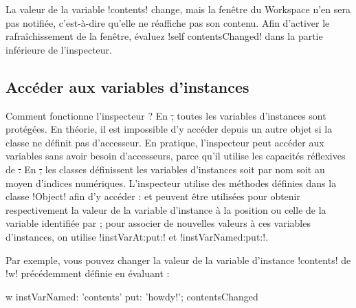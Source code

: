 \documentclass[a4paper,10pt,twoside]{book}
\begin{document}
La valeur de la variable \ct!contents! change, mais la fenêtre du Workspace n'en sera pas notifiée, c'est-à-dire qu'elle ne réaffiche pas son contenu.
Afin d'activer le rafraîchissement de la fenêtre, évaluez \ct!self contentsChanged! dans la partie inférieure de l'inspecteur.

\subsection{Accéder aux variables d'instances}

Comment fonctionne l'inspecteur ?
En \st, toutes les variables d'instances sont protégées.
En théorie, il est impossible d'y accéder depuis un autre objet si la classe ne définit pas d'accesseur.
En pratique, l'inspecteur peut accéder aux variables sans avoir besoin d'accesseurs, parce qu'il utilise les capacités réflexives de \st.
En \st, les classes définissent les variables d'instances soit par nom soit au moyen d'indices numériques.
L'inspecteur utilise des méthodes définies dans la classe \ct!Object! afin d'y accéder :   et  peuvent être utilisées pour obtenir respectivement la valeur de la variable d'instance à la position  ou celle de la variable identifiée par ; pour associer de nouvelles valeurs à ces variables d'instances, on utilise \ct!instVarAt:put:! et \ct!instVarNamed:put:!.

Par exemple, vous pouvez changer la valeur de la variable d'instance \ct!contents! de \ct!w! précédemment définie en évaluant :
\begin{code}{}
w instVarNamed: 'contents' put: 'howdy!'; contentsChanged
\end{code}

\end{document}
